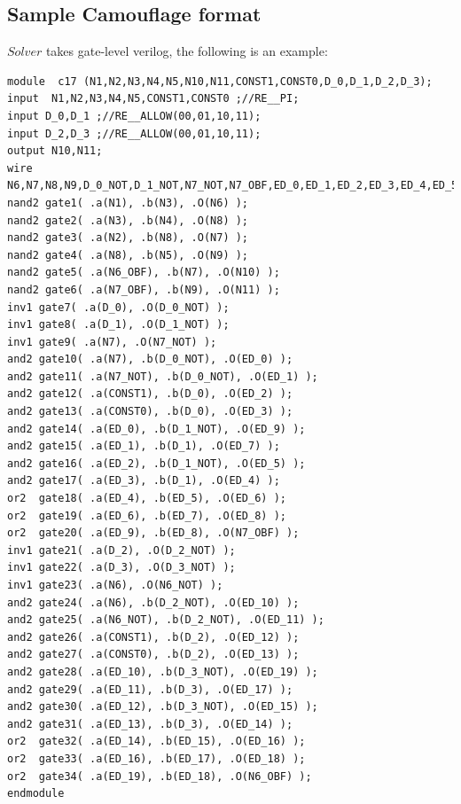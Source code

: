 \documentclass[thesis]{umassthesis}  %
\begin{document}
	\subsection{Sample Camouflage format}
	$Solver$ takes gate-level verilog, the following is an example: 
 	\begin{lstlisting}
module	c17 (N1,N2,N3,N4,N5,N10,N11,CONST1,CONST0,D_0,D_1,D_2,D_3);
input  N1,N2,N3,N4,N5,CONST1,CONST0 ;//RE__PI;
input D_0,D_1 ;//RE__ALLOW(00,01,10,11);
input D_2,D_3 ;//RE__ALLOW(00,01,10,11);
output N10,N11;
wire N6,N7,N8,N9,D_0_NOT,D_1_NOT,N7_NOT,N7_OBF,ED_0,ED_1,ED_2,ED_3,ED_4,ED_5,ED_6,ED_7,ED_8,ED_9,D_2_NOT,D_3_NOT,N6_NOT,N6_OBF,ED_10,ED_11,ED_12,ED_13,ED_14,ED_15,ED_16,ED_17,ED_18,ED_19;   
nand2 gate1( .a(N1), .b(N3), .O(N6) );
nand2 gate2( .a(N3), .b(N4), .O(N8) );
nand2 gate3( .a(N2), .b(N8), .O(N7) );
nand2 gate4( .a(N8), .b(N5), .O(N9) );
nand2 gate5( .a(N6_OBF), .b(N7), .O(N10) );
nand2 gate6( .a(N7_OBF), .b(N9), .O(N11) );
inv1 gate7( .a(D_0), .O(D_0_NOT) );
inv1 gate8( .a(D_1), .O(D_1_NOT) );
inv1 gate9( .a(N7), .O(N7_NOT) );
and2 gate10( .a(N7), .b(D_0_NOT), .O(ED_0) );
and2 gate11( .a(N7_NOT), .b(D_0_NOT), .O(ED_1) );
and2 gate12( .a(CONST1), .b(D_0), .O(ED_2) );
and2 gate13( .a(CONST0), .b(D_0), .O(ED_3) );
and2 gate14( .a(ED_0), .b(D_1_NOT), .O(ED_9) );
and2 gate15( .a(ED_1), .b(D_1), .O(ED_7) );
and2 gate16( .a(ED_2), .b(D_1_NOT), .O(ED_5) );
and2 gate17( .a(ED_3), .b(D_1), .O(ED_4) );
or2  gate18( .a(ED_4), .b(ED_5), .O(ED_6) );
or2  gate19( .a(ED_6), .b(ED_7), .O(ED_8) );
or2  gate20( .a(ED_9), .b(ED_8), .O(N7_OBF) );
inv1 gate21( .a(D_2), .O(D_2_NOT) );
inv1 gate22( .a(D_3), .O(D_3_NOT) );
inv1 gate23( .a(N6), .O(N6_NOT) );
and2 gate24( .a(N6), .b(D_2_NOT), .O(ED_10) );
and2 gate25( .a(N6_NOT), .b(D_2_NOT), .O(ED_11) );
and2 gate26( .a(CONST1), .b(D_2), .O(ED_12) );
and2 gate27( .a(CONST0), .b(D_2), .O(ED_13) );
and2 gate28( .a(ED_10), .b(D_3_NOT), .O(ED_19) );
and2 gate29( .a(ED_11), .b(D_3), .O(ED_17) );
and2 gate30( .a(ED_12), .b(D_3_NOT), .O(ED_15) );
and2 gate31( .a(ED_13), .b(D_3), .O(ED_14) );
or2  gate32( .a(ED_14), .b(ED_15), .O(ED_16) );
or2  gate33( .a(ED_16), .b(ED_17), .O(ED_18) );
or2  gate34( .a(ED_19), .b(ED_18), .O(N6_OBF) );
endmodule
  		\end{lstlisting}
\end{document}
